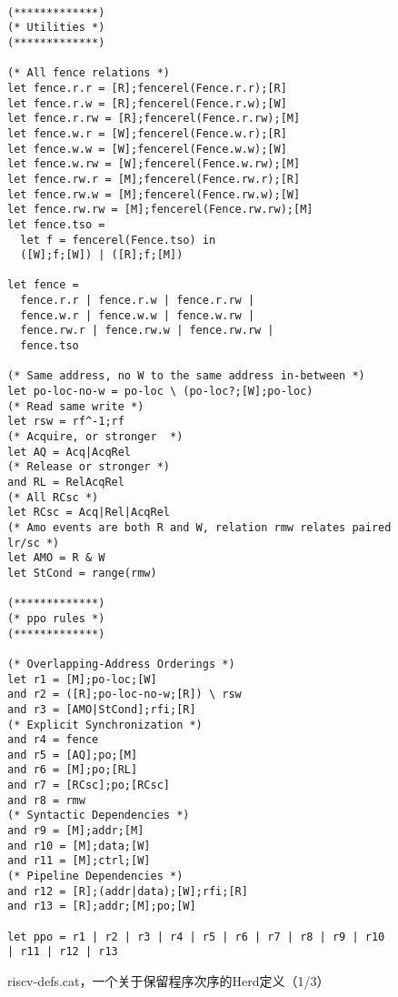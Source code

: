 \begin{figure}[h!]
  {
  \tt\bfseries\centering\footnotesize
  \begin{lstlisting}
(*************)
(* Utilities *)
(*************)

(* All fence relations *)
let fence.r.r = [R];fencerel(Fence.r.r);[R]
let fence.r.w = [R];fencerel(Fence.r.w);[W]
let fence.r.rw = [R];fencerel(Fence.r.rw);[M]
let fence.w.r = [W];fencerel(Fence.w.r);[R]
let fence.w.w = [W];fencerel(Fence.w.w);[W]
let fence.w.rw = [W];fencerel(Fence.w.rw);[M]
let fence.rw.r = [M];fencerel(Fence.rw.r);[R]
let fence.rw.w = [M];fencerel(Fence.rw.w);[W]
let fence.rw.rw = [M];fencerel(Fence.rw.rw);[M]
let fence.tso =
  let f = fencerel(Fence.tso) in
  ([W];f;[W]) | ([R];f;[M])

let fence = 
  fence.r.r | fence.r.w | fence.r.rw |
  fence.w.r | fence.w.w | fence.w.rw |
  fence.rw.r | fence.rw.w | fence.rw.rw |
  fence.tso

(* Same address, no W to the same address in-between *)
let po-loc-no-w = po-loc \ (po-loc?;[W];po-loc)
(* Read same write *)
let rsw = rf^-1;rf
(* Acquire, or stronger  *)
let AQ = Acq|AcqRel
(* Release or stronger *)
and RL = RelAcqRel
(* All RCsc *)
let RCsc = Acq|Rel|AcqRel
(* Amo events are both R and W, relation rmw relates paired lr/sc *)
let AMO = R & W
let StCond = range(rmw)

(*************)
(* ppo rules *)
(*************)

(* Overlapping-Address Orderings *)
let r1 = [M];po-loc;[W]
and r2 = ([R];po-loc-no-w;[R]) \ rsw
and r3 = [AMO|StCond];rfi;[R]
(* Explicit Synchronization *)
and r4 = fence
and r5 = [AQ];po;[M]
and r6 = [M];po;[RL]
and r7 = [RCsc];po;[RCsc]
and r8 = rmw
(* Syntactic Dependencies *)
and r9 = [M];addr;[M]
and r10 = [M];data;[W]
and r11 = [M];ctrl;[W]
(* Pipeline Dependencies *)
and r12 = [R];(addr|data);[W];rfi;[R]
and r13 = [R];addr;[M];po;[W]

let ppo = r1 | r2 | r3 | r4 | r5 | r6 | r7 | r8 | r9 | r10 | r11 | r12 | r13
\end{lstlisting}
  }
  \caption{riscv-defs.cat，一个关于保留程序次序的Herd定义（1/3）
    }
  \label{fig:herd1}
\end{figure}

